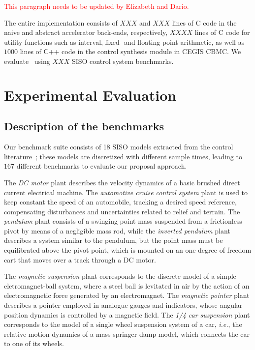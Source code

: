 \documentclass[twocolumn]{autart}    %
\begin{document}
\textcolor{red}{This paragraph needs to be updated by Elizabeth and Dario.}

The entire implementation consists of $XXX$ and $XXX$ lines of C code in the naive and abstract
accelerator back-ends, respectively, $XXXX$ lines of C code for utility functions such as interval, 
fixed- and floating-point arithmetic, as well as $1000$ lines of C++ code in the control synthesis
module in CEGIS CBMC.  We evaluate \tool~using $XXX$ SISO control system
benchmarks.

\section{Experimental Evaluation}
\label{exp:evaluation}

\subsection{Description of the benchmarks}
\label{exp:benchmarks}


Our benchmark suite consists of 18 SISO models extracted from the 
control literature~\cite{acrobot,cstr,CHEN1979389,KOKOTOVIC198023,gajic2008optimal,Franklin15, maglev, converters, CTMS};
these models are discretized with different sample times, leading to $167$ different benchmarks
to evaluate our proposal approach. 


The \textit{DC motor} plant describes the velocity dynamics of a basic 
brushed direct current electrical machine. 
The \textit{automotive cruise control system} plant is used to keep constant 
the speed of an automobile, tracking a desired speed reference, 
compensating disturbances and uncertainties related to relief and terrain.
The \textit{pendulum} plant consists of a swinging point mass suspended from 
a frictionless pivot by means of a negligible mass rod, while the 
\textit{inverted pendulum} plant describes a system similar to the pendulum, but the point 
mass must be equilibrated above the pivot point, which is mounted on an 
one degree of freedom cart that moves over a track through a DC motor.

The \textit{magnetic suspension} plant corresponds to the discrete model of a 
simple eletromagnet-ball system, where a steel ball is levitated in air 
by the action of an electromagnetic force generated by an electromagnet.
The \textit{magnetic pointer} plant describes a pointer employed in analogue 
gauges and indicators, whose angular position dynamics is controlled 
by a magnetic field. 
The \textit{1/4 car suspension} plant corresponds to the model of a single 
wheel suspension system of a car, {\it i.e.}, the relative motion dynamics 
of a mass springer damp model, which connects the car to one of its wheels.
\end{document}
